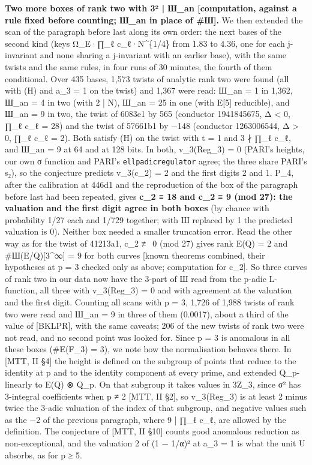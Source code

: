 \documentclass[11pt,a4paper]{article}
\theoremstyle{named}
\begin{document}
\textbf{Two more boxes of rank two with 3² | Ш\_an [computation, against a rule fixed before counting; Ш\_an in place of \#Ш].} We then extended the scan of the paragraph before last along its own order: the next bases of the second kind (keys Ω\_E·∏\_ℓ c\_ℓ·N\textasciicircum{}\{1/4\} from 1.83 to 4.36, one for each j-invariant and none sharing a j-invariant with an earlier base), with the same twists and the same rules, in four runs of 30 minutes, the fourth of them conditional. Over 435 bases, 1,573 twists of analytic rank two were found (all with (H) and a\_3 = 1 on the twist) and 1,367 were read: Ш\_an = 1 in 1,362, Ш\_an = 4 in two (with 2 | N), Ш\_an = 25 in one (with E[5] reducible), and Ш\_an = 9 in two, the twist of 6083e1 by 565 (conductor 1941845675, Δ \textless{} 0, ∏\_ℓ c\_ℓ = 28) and the twist of 57661b1 by −148 (conductor 1263006544, Δ \textgreater{} 0, ∏\_ℓ c\_ℓ = 2). Both satisfy (H) on the twist with t = 1 and 3 ∤ ∏\_ℓ c\_ℓ, and Ш\_an = 9 at 64 and at 128 bits. In both, v\_3(Reg\_3) = 0 (PARI's heights, our own σ function and PARI's \texttt{ellpadicregulator} agree; the three share PARI's s₂), so the conjecture predicts v\_3(c\_2) = 2 and the first digits 2 and 1. P\_4, after the calibration at 446d1 and the reproduction of the box of the paragraph before last had been repeated, gives \textbf{c\_2 ≡ 18 and c\_2 ≡ 9 (mod 27): the valuation and the first digit agree in both boxes} (by chance with probability 1/27 each and 1/729 together; with Ш replaced by 1 the predicted valuation is 0). Neither box needed a smaller truncation error. Read the other way as for the twist of 41213a1, c\_2 ≢ 0 (mod 27) gives rank E(Q) = 2 and \#Ш(E/Q)[3\textasciicircum{}∞] = 9 for both curves [known theorems combined, their hypotheses at p = 3 checked only as above; computation for c\_2]. So three curves of rank two in our data now have the 3-part of Ш read from the p-adic L-function, all three with v\_3(Reg\_3) = 0 and with agreement at the valuation and the first digit. Counting all scans with p = 3, 1,726 of 1,988 twists of rank two were read and Ш\_an = 9 in three of them (0.0017), about a third of the value of [BKLPR], with the same caveats; 206 of the new twists of rank two were not read, and no second point was looked for. Since p = 3 is anomalous in all these boxes (\#E(F\_3) = 3), we note how the normalisation behaves there. In [MTT, II §4] the height is defined on the subgroup of points that reduce to the identity at p and to the identity component at every prime, and extended Q\_p-linearly to E(Q) ⊗ Q\_p. On that subgroup it takes values in 3Z\_3, since σ² has 3-integral coefficients when p ≠ 2 [MTT, II §2], so v\_3(Reg\_3) is at least 2 minus twice the 3-adic valuation of the index of that subgroup, and negative values such as the −2 of the previous paragraph, where 9 | ∏\_ℓ c\_ℓ, are allowed by the definition. The conjecture of [MTT, II §10] counts good anomalous reduction as non-exceptional, and the valuation 2 of (1 − 1/α)² at a\_3 = 1 is what the unit U absorbs, as for p ≥ 5.
\end{document}
